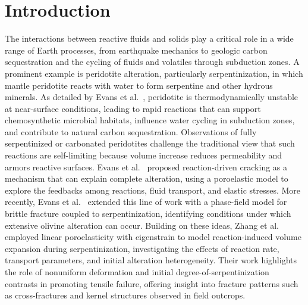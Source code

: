 \documentclass[11pt]{article}
\begin{document}
\section{Introduction}
%
The interactions between reactive fluids and solids play a critical role in a wide range of Earth processes, from earthquake mechanics to geologic carbon sequestration and the cycling of fluids and volatiles through subduction zones. A prominent example is peridotite alteration, particularly serpentinization, in which mantle peridotite reacts with water to form serpentine and other hydrous minerals. As detailed by Evans et al.~\cite{evans2018}, peridotite is thermodynamically unstable at near-surface conditions, leading to rapid reactions that can support chemosynthetic microbial habitats, influence water cycling in subduction zones, and contribute to natural carbon sequestration. Observations of fully serpentinized or carbonated peridotites challenge the traditional view that such reactions are self-limiting because volume increase reduces permeability and armors reactive surfaces. Evans et al.~\cite{evans2018} proposed reaction-driven cracking as a mechanism that can explain complete alteration, using a poroelastic model to explore the feedbacks among reactions, fluid transport, and elastic stresses. More recently, Evans et al.~\cite{evans2020phasefield} extended this line of work with a phase-field model for brittle fracture coupled to serpentinization, identifying conditions under which extensive olivine alteration can occur. Building on these ideas, Zhang et al.~\cite{zhang2025} employed linear poroelasticity with eigenstrain to model reaction-induced volume expansion during serpentinization, investigating the effects of reaction rate, transport parameters, and initial alteration heterogeneity. Their work highlights the role of nonuniform deformation and initial degree-of-serpentinization contrasts in promoting tensile failure, offering insight into fracture patterns such as cross-fractures and kernel structures observed in field outcrops.
\end{document}

